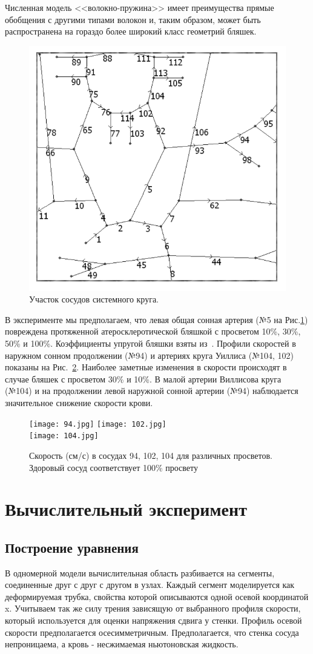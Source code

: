 Численная модель <<волокно-пружина>> имеет преимущества прямые обобщения с другими типами волокон и, таким образом, 
может быть распространена на гораздо более широкий класс геометрий бляшек.

\begin{figure}[h]
\centering
\includegraphics[width=0.4\linewidth]{chast.png}
\caption{Участок сосудов системного круга.}
\label{ych}
\end{figure}

В эксперименте мы предполагаем, что левая общая сонная артерия (№5 на Рис.\ref{ych}) повреждена протяженной атеросклеротической бляшкой 
с просветом 10\%, 30\%, 50\% и 100\%. Коэффициенты упругой бляшки взяты из~\cite{vassilevski:2011}. 
Профили скоростей в наружном сонном продолжении (№94) и артериях круга Уиллиса (№104, 102) показаны на Рис.~\ref{sc}. 
Наиболее заметные изменения в скорости происходят в случае бляшек с просветом 30\% и 10\%. 
В малой артерии Виллисова круга (№104) и на продолжении левой наружной сонной артерии (№94) наблюдается значительное снижение скорости крови.

\begin{figure}[h]
\centering
\texttt{[image: 94.jpg]}
\texttt{[image: 102.jpg]}\\
\texttt{[image: 104.jpg]}
\caption{Скорость (см/с) в сосудах 94, 102, 104 для различных просветов. Здоровый сосуд
соответствует 100\% просвету}
\label{sc}
\end{figure}


\section{Вычислительный эксперимент}
\subsection*{Построение уравнения}

В одномерной модели вычислительная область разбивается на сегменты, соединенные друг с друг с другом в узлах. 
Каждый сегмент моделируется как деформируемая трубка, свойства которой описываются одной осевой координатой x. 
Учитываем так же силу трения зависящую от выбранного профиля скорости, который используется для оценки напряжения сдвига у стенки. 
Профиль осевой скорости предполагается осесимметричным.
Предполагается, что стенка сосуда непроницаема, а кровь - несжимаемая ньютоновская жидкость.

